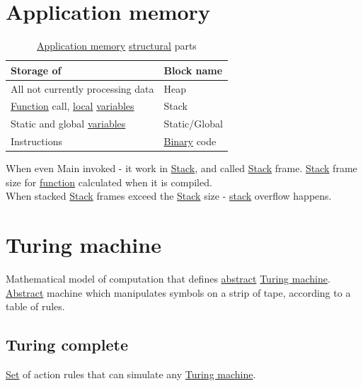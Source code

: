 \documentclass[a4paper,14pt,oneside]{book}
\begin{document}
{\section{\label{orgfe13812}Application memory}
\label{sec:org9d655e1}
\begin{table}[htbp]
\caption{\label{tab--application-memory-structural-parts}\hyperref[orgfe13812]{Application memory} \hyperref[orgf8c4120]{structural} parts}
\centering
\begin{tabu} spread \linewidth {ll}
\toprule
Storage of & Block name\\
\midrule
All not currently processing data & \label{org4839057}Heap\\
\hyperref[org6a60524]{Function} call, \hyperref[org26c2e3f]{local} \hyperref[org3e16d0c]{variables} & \label{org507f473}Stack\\
Static and global \hyperref[org3e16d0c]{variables} & Static/Global\\
Instructions & \hyperref[orge428263]{Binary} code\\
\bottomrule
\end{tabu}
\end{table}

When even Main invoked - it work in \hyperref[org507f473]{Stack}, and called \hyperref[org507f473]{Stack} frame. \hyperref[org507f473]{Stack} frame size for \hyperref[org6a60524]{function} calculated when it is compiled.\\
When stacked \hyperref[org507f473]{Stack} frames exceed the \hyperref[org507f473]{Stack} size - \hyperref[org507f473]{stack} overflow happens.\\

\section{\label{org7a1bcc5}Turing machine}
\label{sec:org494e278}
Mathematical model of computation that defines \hyperref[org3affb7d]{abstract} \hyperref[org7a1bcc5]{Turing machine}. \hyperref[org3affb7d]{Abstract} machine which manipulates symbols on a strip of tape, according to a table of rules.\\

\subsection{\label{orgb59a93a}Turing complete}
\label{sec:orgdb7d896}

\hyperref[org0726f94]{Set} of action rules that can simulate any \hyperref[org7a1bcc5]{Turing machine}.\\

}
\end{document}
